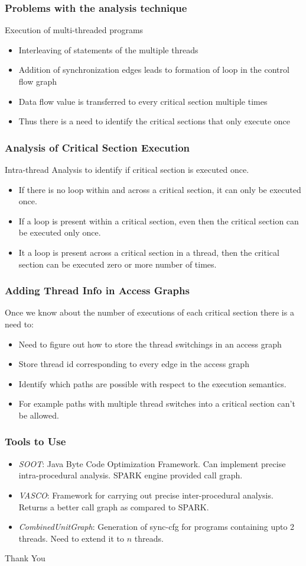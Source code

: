 \documentclass{beamer}
\begin{document}
\begin{frame}
	\frametitle{Problems with the analysis technique}
	Execution of multi-threaded programs
	\begin{itemize}
		\item Interleaving of statements of the multiple threads
		\item Addition of synchronization edges leads to formation of loop in the control flow graph
		\item Data flow value is transferred to every critical section multiple times
		\item Thus there is a need to identify the critical sections that only execute once
	\end{itemize}
\end{frame}

\begin{frame}
	\frametitle{Analysis of Critical Section Execution}
	Intra-thread Analysis to identify if critical section is executed once. 
	\begin{itemize}
		\item If there is no loop within and across a critical section, it can only be executed once.
		\item If a loop is present within a critical section, even then the critical section can be executed only once.
		\item It a loop is present across a critical section in a thread, then the critical section can be executed zero or more number of times.
	\end{itemize}
\end{frame}

\begin{frame}
	\frametitle{Adding Thread Info in Access Graphs}
	Once we know about the number of executions of each critical section there is a need to:  
	\begin{itemize}
		\item Need to figure out how to store the thread switchings in an access graph
		\item Store thread id corresponding to every edge in the access graph
		\item Identify which paths are possible with respect to the execution semantics.
		\item For example paths with multiple thread switches into a critical section can't be allowed.  
	\end{itemize}
\end{frame}


\begin{frame}
	\frametitle{Tools to Use}
	\begin{itemize}
		\item \emph{SOOT}: Java Byte Code Optimization Framework. Can implement precise intra-procedural analysis. SPARK engine provided call graph.
		\item \emph{VASCO}: Framework for carrying out precise inter-procedural analysis. Returns a better call graph as compared to SPARK.
		\item \emph{CombinedUnitGraph}: Generation of sync-cfg for programs containing upto 2 threads. Need to extend it to $n$ threads.
	\end{itemize}
\end{frame}

\begin{frame}

\Huge Thank You

\end{frame}
\end{document}

